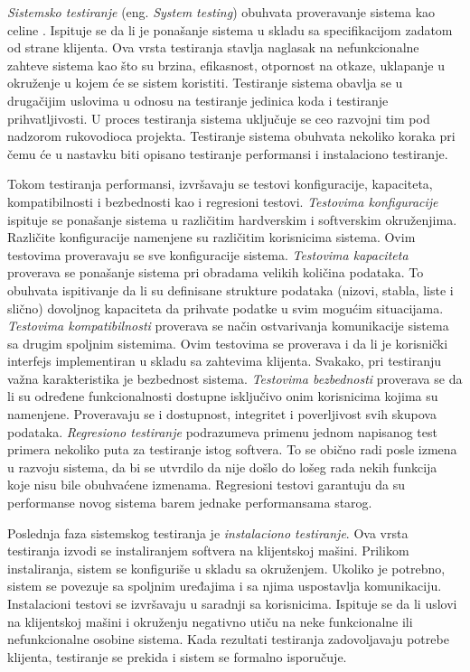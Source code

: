 \documentclass[12pt,oneside]{memoir}
\begin{document}
\emph{Sistemsko testiranje} (eng. \textit{System testing}) obuhvata proveravanje sistema kao celine \cite{SystemTesting}. Ispituje se da li je ponašanje sistema u skladu sa specifikacijom zadatom od strane klijenta.
Ova vrsta testiranja stavlja naglasak na nefunkcionalne zahteve sistema kao što su brzina, efikasnost, otpornost na otkaze, uklapanje u okruženje u kojem će se sistem koristiti. 
Testiranje sistema obavlja se u drugačijim uslovima u odnosu na testiranje jedinica koda i testiranje prihvatljivosti. 
U proces testiranja sistema uključuje se ceo razvojni tim pod nadzorom rukovodioca projekta.
Testiranje sistema obuhvata nekoliko koraka pri čemu će u nastavku biti opisano testiranje performansi i instalaciono testiranje. 
\par
Tokom testiranja performansi, izvršavaju se testovi konfiguracije, kapaciteta, kompatibilnosti i bezbednosti kao i regresioni testovi. \emph{Testovima konfiguracije} ispituje se ponašanje sistema u različitim hardverskim i softverskim okruženjima. 
Različite konfiguracije namenjene su različitim korisnicima sistema.
Ovim testovima proveravaju se sve konfiguracije sistema. 
\emph{Testovima kapaciteta} proverava se ponašanje sistema pri obradama velikih količina podataka. To obuhvata ispitivanje da li su definisane strukture podataka (nizovi, stabla, liste i slično) dovoljnog kapaciteta da prihvate podatke u svim mogućim situacijama.
\emph{Testovima kompatibilnosti} proverava se način ostvarivanja komunikacije sistema sa drugim spoljnim sistemima.
Ovim testovima se proverava i da li je korisnički interfejs implementiran u skladu sa zahtevima klijenta. 
Svakako, pri testiranju važna karakteristika je bezbednost sistema.
\emph{Testovima bezbednosti} proverava se da li su određene funkcionalnosti dostupne isključivo onim korisnicima kojima su namenjene. Proveravaju se i dostupnost, integritet i poverljivost svih skupova podataka. 
\emph{Regresiono testiranje} podrazumeva primenu jednom napisanog test primera nekoliko puta za testiranje istog softvera. 
To se obično radi posle izmena u razvoju sistema, da bi se utvrdilo da nije došlo do lošeg rada nekih funkcija koje nisu bile obuhvaćene izmenama. 
Regresioni testovi garantuju da su performanse novog sistema barem jednake performansama starog. 

\par
Poslednja faza sistemskog testiranja je \emph{instalaciono testiranje}.
Ova vrsta testiranja izvodi se instaliranjem softvera na klijentskoj mašini.
Prilikom instaliranja, sistem se konfiguriše u skladu sa okruženjem.
Ukoliko je potrebno, sistem se povezuje sa spoljnim uređajima i sa njima uspostavlja komunikaciju. 
Instalacioni testovi se izvršavaju u saradnji sa korisnicima. Ispituje se da li uslovi na klijentskoj mašini i okruženju negativno utiču na neke funkcionalne ili nefunkcionalne osobine sistema. 
Kada rezultati testiranja zadovoljavaju potrebe klijenta, testiranje se prekida i sistem se formalno isporučuje.
\par
\end{document}
